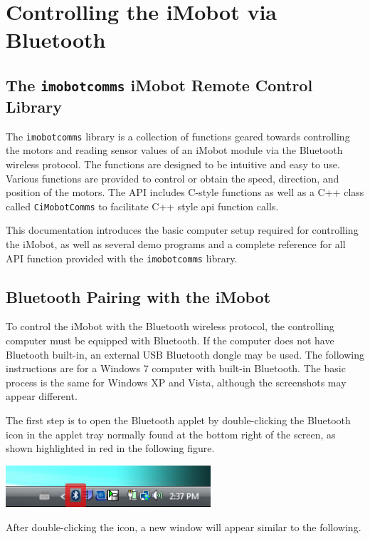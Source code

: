 \documentclass[11pt]{report}
\begin{document}
\chapter{Controlling the iMobot via Bluetooth}
\section{The \texttt{imobotcomms} iMobot Remote Control Library}
The \texttt{imobotcomms} library is a collection of functions geared towards
controlling the motors and reading sensor values of an iMobot module via the
Bluetooth wireless protocol. The functions are designed to be intuitive
and easy to use. Various functions are provided to control or obtain the speed,
direction, and position of the motors. The API includes C-style functions as well
as a C++ class called \texttt{CiMobotComms} to facilitate C++ style api function
calls. 

This documentation introduces the basic computer setup required for controlling 
the iMobot, as well as several demo programs and a complete reference for all
API function provided with the \texttt{imobotcomms} library.

\section{Bluetooth Pairing with the iMobot}
To control the iMobot with the Bluetooth wireless protocol, the controlling 
computer must be equipped with Bluetooth. If the computer does not have
Bluetooth built-in, an external USB Bluetooth dongle may be used. The following
instructions are for a Windows 7 computer with built-in Bluetooth. The basic
process is the same for Windows XP and Vista, although the screenshots may
appear different. 

The first step is to open the Bluetooth applet by double-clicking the Bluetooth
icon in the applet tray normally found at the bottom right of the screen, as
shown highlighted in red in the following figure.

\begin{center}
\includegraphics[width=3in]{images/imobot_connect_1.png}
\end{center}

After double-clicking the icon, a new window will appear similar to the following.
\end{document}
